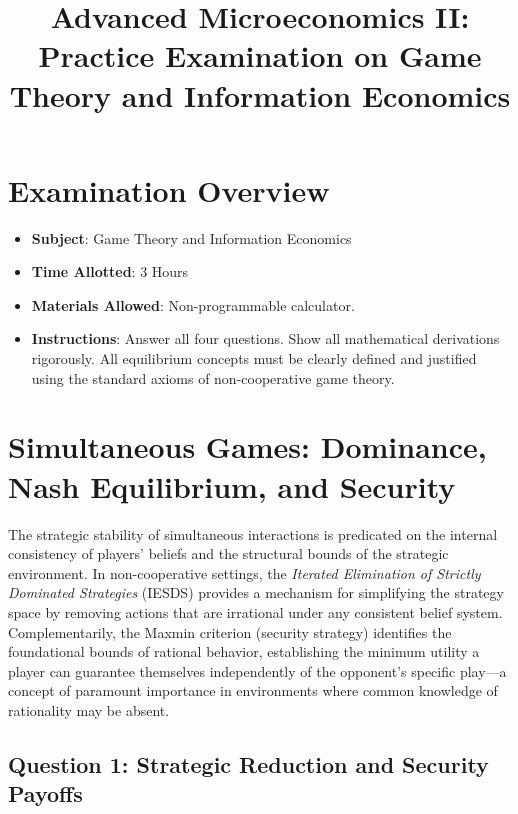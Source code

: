 \documentclass[12pt,a4paper]{article}
\title{\textbf{Advanced Microeconomics II:}\\[0.25em]
       \Large Practice Examination on Game Theory and Information Economics}
\author{ }
\date{ }
\begin{document}
\maketitle

\section*{Examination Overview}

\begin{itemize}
  \item \textbf{Subject}: Game Theory and Information Economics
  \item \textbf{Time Allotted}: 3 Hours
  \item \textbf{Materials Allowed}: Non-programmable calculator.
  \item \textbf{Instructions}: Answer all four questions. Show all mathematical derivations rigorously.
        All equilibrium concepts must be clearly defined and justified using the standard axioms of
        non-cooperative game theory.
\end{itemize}

\bigskip
\noindent\hrulefill
\bigskip


\section{Simultaneous Games: Dominance, Nash Equilibrium, and Security}

The strategic stability of simultaneous interactions is predicated on the internal consistency
of players' beliefs and the structural bounds of the strategic environment. In non-cooperative
settings, the \emph{Iterated Elimination of Strictly Dominated Strategies} (IESDS) provides a
mechanism for simplifying the strategy space by removing actions that are irrational under any
consistent belief system. Complementarily, the Maxmin criterion (security strategy) identifies the
foundational bounds of rational behavior, establishing the minimum utility a player can guarantee
themselves independently of the opponent's specific play---a concept of paramount importance in
environments where common knowledge of rationality may be absent.

\subsection*{Question 1: Strategic Reduction and Security Payoffs}
\end{document}
